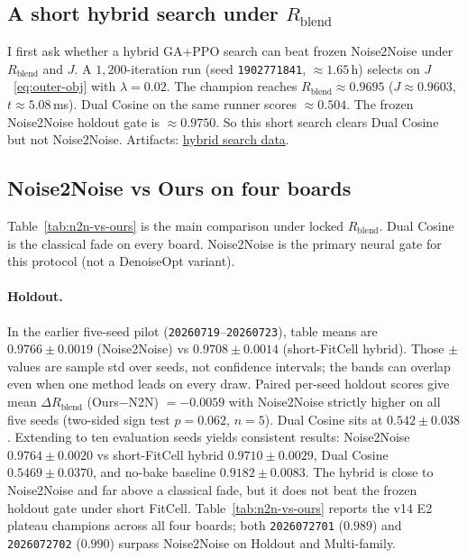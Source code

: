 \subsection{A short hybrid search under $R_{\mathrm{blend}}$}
\label{sec:v10-freeze}

I first ask whether a hybrid GA+PPO search can beat frozen Noise2Noise under $R_{\mathrm{blend}}$ and $J$.
A $1{,}200$-iteration run (seed \texttt{1902771841}, ${\approx}1.65$\,h) selects on $J$~\eqref{eq:outer-obj} with $\lambda{=}0.02$.
The champion reaches $R_{\mathrm{blend}}{\approx}0.9695$ ($J{\approx}0.9603$, $t{\approx}5.08$\,ms).
Dual Cosine on the same runner scores ${\approx}0.504$.
The frozen Noise2Noise holdout gate is ${\approx}0.9750$.
So this short search clears Dual Cosine but not Noise2Noise.
Artifacts:
\href{https://github.com/reeldemo/denoise-opt}{hybrid search data}.

\subsection{Noise2Noise vs Ours on four boards}
\label{sec:n2n-vs-ours-boards}

Table~\ref{tab:n2n-vs-ours} is the main comparison under locked $R_{\mathrm{blend}}$.
Dual Cosine is the classical fade on every board.
Noise2Noise is the primary neural gate for this protocol (not a DenoiseOpt variant).

\paragraph{Holdout.}
In the earlier five-seed pilot (\texttt{20260719}--\texttt{20260723}), table means are
$0.9766{\pm}0.0019$ (Noise2Noise) vs $0.9708{\pm}0.0014$ (short-FitCell hybrid).
Those $\pm$ values are sample std over seeds, not confidence intervals; the bands can overlap even when one method leads on every draw.
Paired per-seed holdout scores give mean $\Delta R_{\mathrm{blend}}$ (Ours$-$N2N) $={-}0.0059$ with Noise2Noise strictly higher on all five seeds (two-sided sign test $p{=}0.062$, $n{=}5$).
Dual Cosine sits at $0.542{\pm}0.038$.
Extending to ten evaluation seeds yields consistent results: Noise2Noise $0.9764{\pm}0.0020$ vs short-FitCell hybrid $0.9710{\pm}0.0029$, Dual Cosine $0.5469{\pm}0.0370$, and no-bake baseline $0.9182{\pm}0.0083$.
The hybrid is close to Noise2Noise and far above a classical fade, but it does not beat the frozen holdout gate under short FitCell. Table~\ref{tab:n2n-vs-ours} reports the v14 E2 plateau champions across all four boards; both \texttt{2026072701} ($0.989$) and \texttt{2026072702} ($0.990$) surpass Noise2Noise on Holdout and Multi-family.

